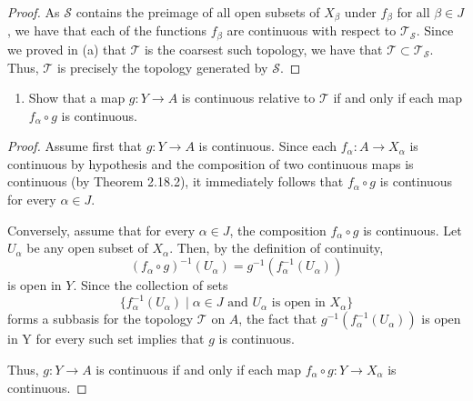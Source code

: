 \documentclass[a4paper,10pt]{article}
\newcommand{\inv}{^{-1}}
\begin{document}
\begin{solution}
\begin{proof}
        As $\mathcal{S}$ contains the preimage of all open subsets of $X_\beta$ under $f_\beta$ for all $\beta \in J$, we have that each of the functions $f_\beta$ are continuous with respect to $\mathcal{T}_\mathcal{S}$.
        Since we proved in (a) that $\mathcal{T}$ is the coarsest such topology, we have that $\mathcal{T} \subset \mathcal{T}_\mathcal{S}$.
        Thus, $\mathcal{T}$ is precisely the topology generated by $\mathcal{S}$.
    \end{proof}
    \bigskip

    \begin{enumerate}[label={(\alph*)}, align=left, leftmargin=\parindent, listparindent=\parindent, labelwidth=0pt, itemindent=!]
        \addtocounter{enumi}{2} 
        \item Show that a map $g: Y \rightarrow A$ is continuous relative to $\mathcal{T}$ if and only if each map $f_\alpha \circ g$ is continuous.
    \end{enumerate}
    \begin{proof}
        Assume first that $g: Y \rightarrow A$ is continuous.
        Since each  $f_\alpha: A \rightarrow X_\alpha$ is continuous by hypothesis and the composition of two continuous maps is continuous (by Theorem 2.18.2), it immediately follows that $f_\alpha \circ g$ is continuous for every $\alpha \in J$.

        Conversely, assume that for every $\alpha \in J$, the composition $f_\alpha \circ g$ is continuous.
        Let $U_\alpha$ be any open subset of $X_\alpha$.
        Then, by the definition of continuity,
        \begin{equation*}
            (f_\alpha \circ g)\inv(U_\alpha) = g\inv(f_\alpha\inv(U_\alpha))
        \end{equation*}
        is open in $Y$.
        Since the collection of sets
        \begin{equation*}
            \{f_\alpha\inv(U_\alpha) \mid \alpha \in J \text{ and } U_\alpha \text{ is open in } X_\alpha\}
        \end{equation*}
        forms a subbasis for the topology $\mathcal{T}$ on $A$, the fact that $g\inv(f_\alpha\inv(U_\alpha))$ is open in Y for every such set implies that $g$ is continuous.

        Thus, $g: Y \rightarrow A$ is continuous if and only if each map $f_\alpha \circ g: Y \rightarrow X_\alpha$ is continuous.
    \end{proof}
    \bigskip


\end{solution}
\end{document}
